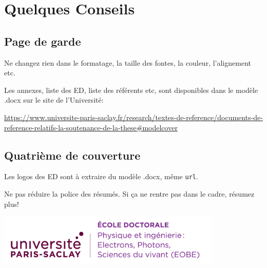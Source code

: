 \documentclass[french,12pt,a4paper]{book}
\begin{document}
\begin{titlepage}
\begin{tabular}{|p{7cm}l}
\end{tabular} 


\end{titlepage}


% 

\chapter{Quelques Conseils}
\section{Page de garde}
Ne changez rien dans le formatage, la taille des fontes, la couleur, l'alignement etc.

Les annexes, liste des ED, liste des référents etc, sont disponibles dans le modèle .docx sur le site de l'Université:

\url{https://www.universite-paris-saclay.fr/research/textes-de-reference/documents-de-reference-relatifs-la-soutenance-de-la-these#modelcover}

\section{Quatrième de couverture}

Les logos des ED sont à extraire du modèle .docx, même \verb!url!.

Ne pas réduire la police des résumés. Si ça ne rentre pas dans le cadre, résumez plus!

\ifthispageodd{\newpage\thispagestyle{empty}\null\newpage}{}
\thispagestyle{empty}
\selectfont

\lhead{}
\rhead{}
\rfoot{}
\cfoot{}
\lfoot{}

\noindent 
\includegraphics[height=2.45cm]{EOBE}
\vspace{1cm}
\selectfont
\end{document}
